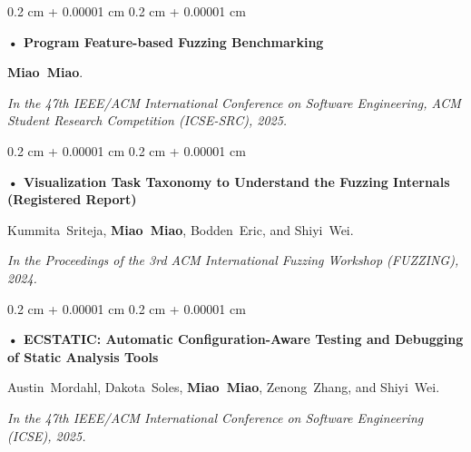\documentclass[10pt, letterpaper]{article}
\newenvironment{onecolentry}{
    \begin{adjustwidth}{
        0.2 cm + 0.00001 cm
    }{
        0.2 cm + 0.00001 cm
    }
}{
    \end{adjustwidth}
} %
\begin{document}
            \begin{onecolentry}
                \textbf{• Program Feature-based Fuzzing Benchmarking}


                \mbox{\textbf{Miao Miao}}.
                
                
                \textit{In the 47th IEEE/ACM International Conference on Software Engineering, ACM Student Research Competition (ICSE-SRC), 2025.}
            \end{onecolentry}

            \vspace{0.20 cm}
            
            \begin{onecolentry}
                \textbf{• Visualization Task Taxonomy to Understand the Fuzzing Internals (Registered Report)}


                \mbox{Kummita Sriteja}, \mbox{\textbf{Miao Miao}}, \mbox{Bodden Eric}, and \mbox{Shiyi Wei}.
                
                
                \textit{In the Proceedings of the 3rd ACM International Fuzzing Workshop (FUZZING), 2024.}
            \end{onecolentry}

            \vspace{0.20 cm}
            
            \begin{onecolentry}
                \textbf{• ECSTATIC: Automatic Configuration-Aware Testing and Debugging of Static Analysis Tools}


                \mbox{Austin Mordahl}, \mbox{Dakota Soles}, \mbox{\textbf{Miao Miao}}, \mbox{Zenong Zhang}, and \mbox{Shiyi Wei}.
                
                
                \textit{In the 47th IEEE/ACM International Conference on Software Engineering (ICSE), 2025.}
            \end{onecolentry}
\end{document}

